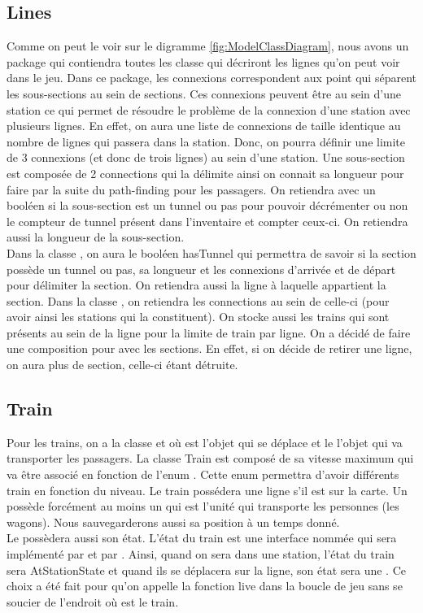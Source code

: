 \documentclass[report, backcover, french, nodocumentinfo]{upmethodology-document}
\begin{document}
			\subsection{Lines}
					Comme on peut le voir sur le digramme \ref{fig:ModelClassDiagram}, nous avons un package  qui contiendra toutes les classe qui décriront les lignes qu'on peut voir dans le jeu. Dans ce package, les connexions correspondent aux point qui séparent les sous-sections au sein de sections. Ces connexions peuvent être au sein d'une station ce qui permet de résoudre le problème de la connexion d'une station avec plusieurs lignes. En effet, on aura une liste de connexions de taille identique au nombre de lignes qui passera dans la station. Donc, on pourra définir une limite de 3 connexions (et donc de trois lignes) au sein d'une station.
					Une sous-section est composée de 2 connections qui la délimite ainsi on connait sa longueur pour faire par la suite du path-finding pour les passagers. On retiendra avec un booléen si la sous-section est un tunnel ou pas pour pouvoir décrémenter ou non le compteur de tunnel présent dans l'inventaire et compter ceux-ci. On retiendra aussi la longueur de la sous-section.\\
					Dans la classe , on aura le booléen hasTunnel qui permettra de savoir si la section possède un tunnel ou pas, sa longueur et les connexions d'arrivée et de départ pour délimiter la section. On retiendra aussi la ligne à laquelle appartient la section.
					Dans la classe , on retiendra les connections au sein de celle-ci (pour avoir ainsi les stations qui la constituent). On stocke aussi les trains qui sont présents au sein de la ligne pour la limite de train par ligne. On a décidé de faire une composition pour avec les sections. En effet, si on décide de retirer une ligne, on aura plus de section, celle-ci étant détruite.
			\subsection{Train}
				Pour les trains, on a la classe  et  où  est l'objet qui se déplace et le  l'objet qui va transporter les passagers. La classe Train est composé de sa vitesse maximum qui va être associé en fonction de l'enum  . Cette enum permettra d'avoir différents train en fonction du niveau. Le train possédera une ligne s'il est sur la carte. Un   possède forcément au moins un   qui est l'unité qui transporte les personnes (les wagons). Nous sauvegarderons aussi sa position à un temps donné.\\
				Le   possèdera aussi son état. L'état du train est une interface nommée  qui sera implémenté par  et par . Ainsi, quand on sera dans une station, l'état du train sera AtStationState et quand ils se déplacera sur la ligne, son état sera une  . Ce choix a été fait pour qu'on appelle la fonction live dans la boucle de jeu sans se soucier de l'endroit où est le train.
\end{document}
